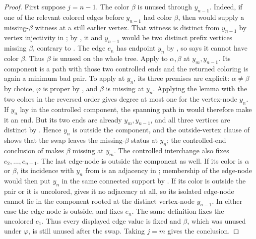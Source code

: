 \begin{proof}
First suppose \(j=n-1\).  The color \(\beta\) is unused through
\(y_{n-1}\).  Indeed, if one of the relevant colored edges before
\(y_{n-1}\) had color \(\beta\), then  would
supply a missing-\(\beta\) witness at a still earlier vertex.  That
witness is distinct from \(y_{n-1}\) by vertex injectivity in
; by , it and
\(y_{n-1}\) would be two distinct prefix vertices missing \(\beta\),
contrary to .  The edge \(e_n\)
has endpoint \(y_n\) by , so
 says it cannot have color \(\beta\).  Thus
\(\beta\) is unused on the whole tree.  Apply
 to \(\alpha,\beta\) at
\(y_m,y_{n-1}\).  Its component is a path with those two controlled
ends and the returned coloring is again a minimum bad pair.  To apply
 at \(y_n\), its three premises
are explicit: \(\alpha\ne\beta\) by choice, \(\varphi\) is proper by
, and \(\beta\) is missing at \(y_n\).  Applying the
lemma with the two colors in the reversed order gives degree at most one
for the vertex-node \(y_n\).  If \(y_n\) lay in the controlled
component, the spanning path in
 would therefore make it an end.
But its two ends are already \(y_m,y_{n-1}\), and all three vertices are
distinct by .  Hence \(y_n\) is outside the
component, and the outside-vertex clause of
 shows that the swap
leaves the missing-\(\beta\) status at \(y_n\); the controlled-end
conclusion of  makes \(\beta\)
missing at \(y_m\).  The controlled interchange also fixes
\(e_2,\ldots,e_{n-1}\).  The last edge-node is outside the component as
well.  If its color is \(\alpha\) or \(\beta\), its incidence with
\(y_n\) from  is an adjacency in
; membership of the edge-node would then
put \(y_n\) in the same connected support by
.  If its color is outside the pair or it is
uncolored,  gives it no adjacency at all,
so its isolated edge-node cannot lie in the component rooted at the
distinct vertex-node \(y_{n-1}\).  In either case the edge-node is
outside, and  fixes \(e_n\).  The same
definition fixes the uncolored \(e_1\).  Thus every displayed edge value
is fixed and \(\beta\), which was unused under \(\varphi\), is still
unused after the swap.
Taking \(j=m\) gives the conclusion.


\end{proof}
